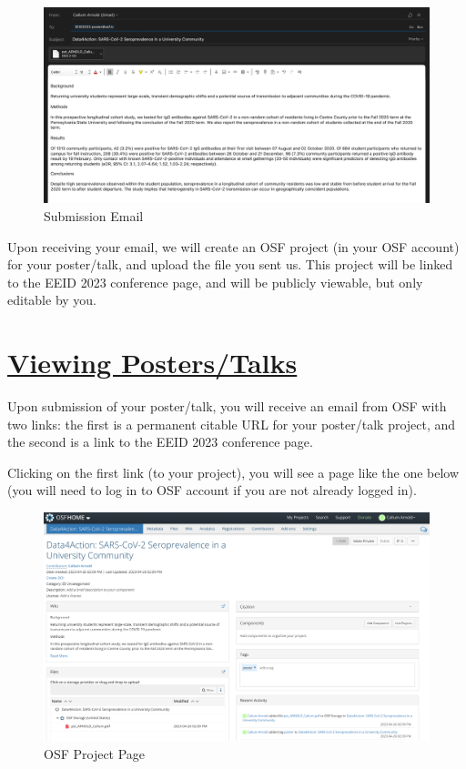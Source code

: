 \documentclass{scrartcl}
\begin{document}
\begin{figure}[h]
    \includegraphics[width=\textwidth]{submission-email.png}
    \caption{Submission Email}
\end{figure}



Upon receiving your email, we will create an OSF project (in your OSF account) for your poster/talk, and upload the file you sent us.
This project will be linked to the EEID 2023 conference page, and will be publicly viewable, but only editable by you.

\section{\underline{Viewing Posters/Talks}}

Upon submission of your poster/talk, you will receive an email from OSF with two links: the first is a permanent citable URL for your poster/talk project, and the second is a link to the EEID 2023 conference page.

Clicking on the first link (to your project), you will see a page like the one below (you will need to log in to OSF account if you are not already logged in).

\begin{figure}[h]
    \includegraphics[width=\textwidth]{project-page-01.png}
    \caption{OSF Project Page}
\end{figure}
\end{document}
